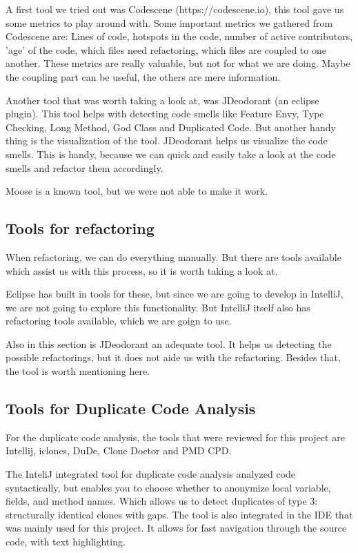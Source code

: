 \documentclass[]{article}
\begin{document}
A first tool we tried out was Codescene (https://codescene.io), this tool gave us some metrics to play around with. Some important metrics we gathered from Codescene are: Lines of code, hotspots in the code, number of active contributors, 'age' of the code, which files need refactoring, which files are coupled to one another. These metrics are really valuable, but not for what we are doing. Maybe the coupling part can be useful, the others are mere information. 

Another tool that was worth taking a look at, was JDeodorant (an eclipse plugin). This tool helps with detecting code smells like Feature Envy, Type Checking, Long Method, God Class and Duplicated Code. But another handy thing is the visualization of the tool. JDeodorant helps us visualize the code smells. This is handy, because we can quick and easily take a look at the code smells and refactor them accordingly. 

Moose is a known tool, but we were not able to make it work. 

\subsection{Tools for refactoring}
When refactoring, we can do everything manually. But there are tools available which assist us with this process, so it is worth taking a look at. 

Eclipse has built in tools for these, but since we are going to develop in IntelliJ, we are not going to explore this functionality. But IntelliJ itself also has refactoring tools available, which we are goign to use.

Also in this section is JDeodorant an adequate tool. It helps us detecting the possible refactorings, but it does not aide us with the refactoring. Besides that, the tool is worth mentioning here. 

\subsection{Tools for Duplicate Code Analysis}
For the duplicate code analysis, the tools that were reviewed for this project are Intellij, iclones, DuDe, Clone Doctor and PMD CPD. 

The InteliJ integrated tool for duplicate code analysis analyzed code syntactically, but enables you to choose whether to anonymize local variable, fields, and method names. Which allows us to detect duplicates of type 3: structurally identical clones with gaps. The tool is also integrated in the IDE that was mainly used for this project. It allows for fast navigation through the source code, with text highlighting. 
\end{document}
